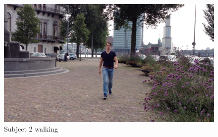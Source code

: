\begin{figure}
\centering
  \includegraphics[width=1\textwidth]{./Figures/chapter6/data_collection/stills/roemer_walk.png}
  \caption[Recording still 7]{Subject 2 walking}
\end{figure}